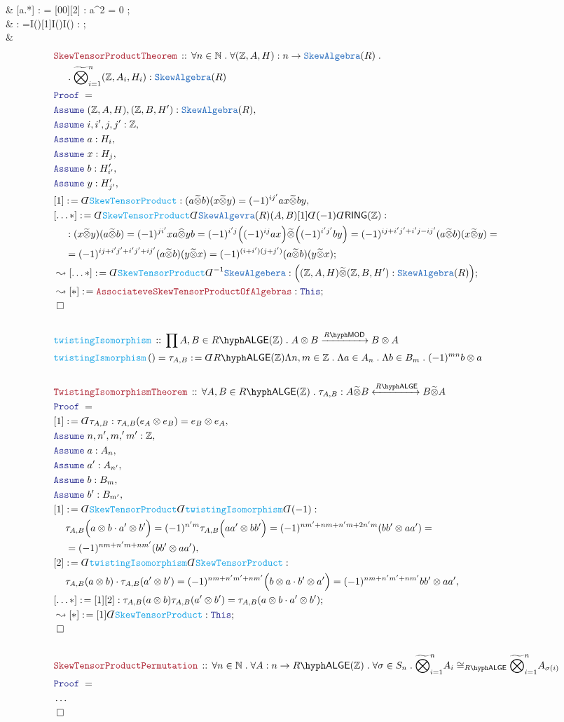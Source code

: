\documentclass[12pt]{scrartcl}%
\newcommand{\TYPE}[1]{\textcolor{NavyBlue}{\mathtt{#1}}}%
\newcommand{\FUNC}[1]{\textcolor{Cerulean}{\mathtt{#1}}}%
\newcommand{\LOGIC}[1]{\textcolor{Blue}{\mathtt{#1}}}%
\newcommand{\THM}[1]{\textcolor{Maroon}{\mathtt{#1}}}%
\renewcommand{\.}{\; . \;} %
\newcommand{\de}{: \kern 0.1pc =} %
\newcommand{\Act}[1]{\left( #1 \right)} %
\newcommand{\Theorem}[2]{& \THM{#1} \, :: \, #2 \\ & \Proof = \\ } %
\newcommand{\DeclareFunc}[2]{& \FUNC{#1} \, :: \, #2 \\}%
\newcommand{\DefineNamedFunc}[4]{&  \FUNC{#1}\Act{#2} = #3 \de #4 \\}%
\newcommand{\NewLine}{\\ & \kern 1pc}%
\newcommand{\Page}[1]{ \begin{align*} #1 \end{align*}  }%
\newcommand{ \bd }{ \ByDef }%
\newcommand{\NoProof}{ & \ldots \\ \EndProof}%
\newcommand{\Int}{\mathbb{Z}}%
\newcommand{\Nat}{\mathbb{N}}%
\newcommand{\Say}[3]{& #1 \de #2 : #3, \\} %
\newcommand{\Conclude}[3]{& #1 \de #2 : #3; \\}%
\newcommand{\DeriveConclude}[3]{& \leadsto #1 \de #2 : #3 ; \\} %
\newcommand{\Assume}[2]{& \LOGIC{Assume} \; #1 : #2, \\} %
\newcommand{\QED}{\; \square} %
\newcommand{\EndProof}{& \QED \\} %
\newcommand{\ByDef}{\rotatebox[origin=c]{-180}{$D$}}%
\newcommand{\Proof}{\LOGIC{Proof} \; } %
\newcommand{\Arrow}[1]{\xrightarrow{#1}}%
\newcommand{\ToIso}[1]{\xleftrightarrow{#1}}%
\newcommand{\LMOD}[1]{#1\hyph\mathsf{MOD}} %
\newcommand{\RING}{\mathsf{RING}} %
\newcommand{\LALGE}[1]{#1\hyph\mathsf{ALGE}}%
\begin{document}
{	\Conclude{[a.*]}{ [00][2]}{ a^2 = 0  }
	\DeriveConclude{[a.*]}{I(\iff)[1]I(\Rightarrow)I(\forall)}{\LOGIC{This}}
	\EndProof
}\Page{
	\Theorem{SkewTensorProductTheorem}{\forall n \in \Nat \. \forall (\Int,A,H) : n \to \TYPE{SkewAlgebra}(R) \. \NewLine \.  \widetilde{\bigotimes}^n_{i=1} (\Int,A_i,H_i) : \TYPE{SkewAlgebra}(R) }
	\Assume{(\Int,A,H),(\Int,B,H')}{\TYPE{SkewAlgebra}(R)}
	\Assume{i,i',j,j'}{\Int}
	\Assume{a}{H_i}
	\Assume{x}{H_j}
	\Assume{b}{H_{i'}'}
	\Assume{y}{H_{j'}'}
	\Say{[1]}{ \bd \FUNC{SkewTensorProduct} }{ (a \widetilde{\otimes} b)(x \widetilde{\otimes} y) = (-1)^{ij'} ax \widetilde{\otimes} by  }
	\Conclude{[\ldots*]}{\bd \FUNC{SkewTensorProduct} \bd \TYPE{SkewAlgevra}(R)(A,B)[1]\bd (-1) \bd \RING(\Int)}{
		\NewLine :
		(x \widetilde{\otimes} y)(a \widetilde{\otimes} b) = 
		(-1)^{ji'} xa \widehat{\otimes} yb =   
		(-1)^{ i'j} \Big( (-1)^{ij}ax \Big) \widetilde{\otimes} \Big( (-1)^{i'j'} by \Big) = 
		(-1)^{ij + i'j' + i'j - ij'} (a \widetilde{\otimes} b) (x \widetilde{\otimes} y) = \NewLine = 
		(-1)^{ij + i'j' + i'j' + ij'} (a \widetilde{\otimes} b) (y \widetilde{\otimes} x) =
		(-1)^{(i + i')(j + j')} (a \widetilde{\otimes} b) (y \widetilde{\otimes} x) 
	}
	\DeriveConclude{[\ldots*]}{\bd \FUNC{SkewTensorProduct} \bd^{-1}\TYPE{SkewAlgebera}}{ \Big( (\Int,A,H) \widetilde{\otimes} (\Int,B,H') : \TYPE{SkewAlgebra}(R) \Big)   }
	\DeriveConclude{[*]}{\THM{AssociateveSkewTensorProductOfAlgebras}}{\LOGIC{This}}
	\EndProof
	\\
	\DeclareFunc{twistingIsomorphism}{\prod A,B \in \LALGE{R}(\Int) \. A \otimes B \Arrow{\LMOD{R}} B \otimes A}
	\DefineNamedFunc{twistingIsmorphism}{}{\tau_{A,B}}{ \bd \LALGE{R}(\Int) \Lambda n,m \in \Int \. \Lambda a \in A_n \. \Lambda b \in B_m \. (-1)^{mn}b \otimes a } 
	\\
	\Theorem{TwistingIsomorphismTheorem}{\forall A,B \in \LALGE{R}(\Int) \. \tau_{A,B} : A \widetilde{\otimes} B \ToIso{\LALGE{R}} B \widetilde{\otimes} A}
	\Say{[1]}{\bd \tau_{A,B}}{\tau_{A,B}(e_A \otimes e_B) = e_B \otimes e_A}
	\Assume{n,n',m,'m'}{\Int}
	\Assume{a}{A_n}
	\Assume{a'}{A_{n'}}
	\Assume{b}{B_{m}}
	\Assume{b'}{B_{m'}}
	\Say{[1]}{\bd \FUNC{SkewTensorProduct} \bd \FUNC{twistingIsomorphism} \bd (-1)}{ 
		\NewLine
		\tau_{A,B}\Big( a \otimes b \cdot a' \otimes  b' \Big) = 
		(-1)^{n'm}\tau_{A,B} \Big( aa' \otimes bb' \Big) = 
		(-1)^{ nm' + nm + n'm + 2n'm }( bb' \otimes aa') =  \NewLine = 
		(-1)^{  nm + n'm + nm' }( bb' \otimes aa')   	
	}
	\Say{[2]}{\bd \FUNC{twistingIsomorphism} \bd \FUNC{SkewTensorProduct}}
	{
		\NewLine 
		\tau_{A,B}(a \otimes b) \cdot \tau_{A,B}(a' \otimes b') =
		(-1)^{nm+ n'm' + nm'} \Big( b\otimes a \cdot b' \otimes a' \Big) = 
		(-1)^{nm + n'm' + nm'} bb' \otimes aa'
	}
	\Conclude{[\ldots*]}{[1][2]}{\tau_{A,B}(a \otimes b)\tau_{A,B}( a' \otimes b') = \tau_{A,B}(a \otimes b \cdot a' \otimes b')}
	\DeriveConclude{[*]}{[1]\bd \FUNC{SkewTensorProduct}}{\LOGIC{This}}
	\EndProof
	\\
	\Theorem{SkewTensorProductPermutation}{ \forall n \in \Nat \. \forall A : n \to \LALGE{R}(\Int) \. \forall \sigma \in S_n \. \widetilde{\bigotimes}^n_{i=1} A_i \cong_{\LALGE{R}} \widetilde{\bigotimes}^n_{i=1} A_{\sigma(i)}  }
	\NoProof
}
\end{document}
